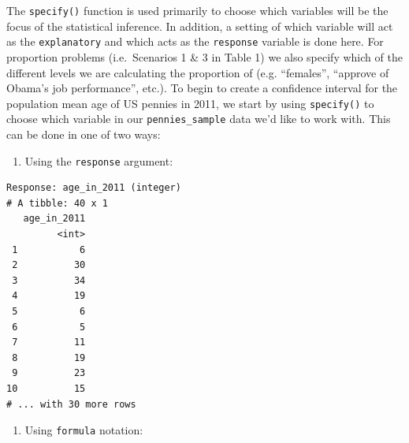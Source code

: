\documentclass[]{article}
\newenvironment{Shaded}{\begin{snugshade}}{\end{snugshade}}
\newcommand{\KeywordTok}[1]{\textcolor[rgb]{0.13,0.29,0.53}{\textbf{#1}}}
\newcommand{\DataTypeTok}[1]{\textcolor[rgb]{0.13,0.29,0.53}{#1}}
\newcommand{\DecValTok}[1]{\textcolor[rgb]{0.00,0.00,0.81}{#1}}
\newcommand{\StringTok}[1]{\textcolor[rgb]{0.31,0.60,0.02}{#1}}
\newcommand{\OtherTok}[1]{\textcolor[rgb]{0.56,0.35,0.01}{#1}}
\newcommand{\OperatorTok}[1]{\textcolor[rgb]{0.81,0.36,0.00}{\textbf{#1}}}
\newcommand{\NormalTok}[1]{#1}
\providecommand{\tightlist}{%
  \setlength{\itemsep}{0pt}\setlength{\parskip}{0pt}}
\begin{document}
The \texttt{specify()} function is used primarily to choose which
variables will be the focus of the statistical inference. In addition, a
setting of which variable will act as the \texttt{explanatory} and which
acts as the \texttt{response} variable is done here. For proportion
problems (i.e.~Scenarios 1 \& 3 in Table 1) we also specify which of the
different levels we are calculating the proportion of (e.g. ``females'',
``approve of Obama's job performance'', etc.). To begin to create a
confidence interval for the population mean age of US pennies in 2011,
we start by using \texttt{specify()} to choose which variable in our
\texttt{pennies\_sample} data we'd like to work with. This can be done
in one of two ways:

\begin{enumerate}
\def\labelenumi{\arabic{enumi}.}
\tightlist
\item
  Using the \texttt{response} argument:
\end{enumerate}

\begin{Shaded}
\end{Shaded}

\begin{verbatim}
Response: age_in_2011 (integer)
# A tibble: 40 x 1
   age_in_2011
         <int>
 1           6
 2          30
 3          34
 4          19
 5           6
 6           5
 7          11
 8          19
 9          23
10          15
# ... with 30 more rows
\end{verbatim}

\begin{enumerate}
\def\labelenumi{\arabic{enumi}.}
\setcounter{enumi}{1}
\tightlist
\item
  Using \texttt{formula} notation:
\end{enumerate}

\begin{Shaded}
\end{Shaded}
\end{document}
